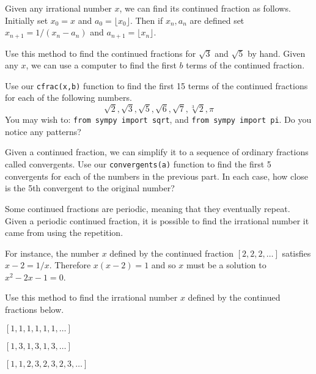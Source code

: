 \documentclass[12pt]{exam}
\begin{document}
\begin{questions}
  \question Given any irrational number $x$, we can find its continued fraction as follows. Initially set $x_0=x$ and $a_0=\lfloor x_0\rfloor$. Then if $x_n,a_n$ are defined set $x_{n+1}=1/(x_n-a_n)$ and $a_{n+1}=\lfloor x_n\rfloor$.
  
  Use this method to find the continued fractions for $\sqrt{3}$ and $\sqrt{5}$ by hand.
  \newpage
  \question Given any $x$, we can use a computer to find the first $b$ terms of the continued fraction.
  \begin{parts}
    \item Use our \texttt{cfrac(x,b)} function to find the first 15 terms of the continued fractions for each of the following numbers.
    \[\sqrt{2}, \sqrt{3}, \sqrt{5}, \sqrt{6}, \sqrt{7}, \sqrt[3]{2}, \pi
    \]
    You may wish to: \texttt{from sympy import sqrt}, and \texttt{from sympy import pi}. Do you notice any patterns?
    \item Given a continued fraction, we can simplify it to a sequence of ordinary fractions called convergents. Use our \texttt{convergents(a)} function to find the first 5 convergents for each of the numbers in the previous part. In each case, how close is the 5th convergent to the original number?
  \end{parts}
  \newpage
  \question Some continued fractions are periodic, meaning that they eventually repeat. Given a periodic continued fraction, it is possible to find the irrational number it came from using the repetition.
  
  For instance, the number $x$ defined by the continued fraction $[2,2,2,\ldots]$ satisfies $x-2=1/x$. Therefore $x(x-2)=1$ and so $x$ must be a solution to $x^2-2x-1=0$.
  
  Use this method to find the irrational number $x$ defined by the continued fractions below.
  \begin{parts}
    \item $[1,1,1,1,1,1,\ldots]$
    \item $[1,3,1,3,1,3,\ldots]$
    \item $[1,1,2,3,2,3,2,3,\ldots]$
  \end{parts}
\end{questions}
\end{document}
